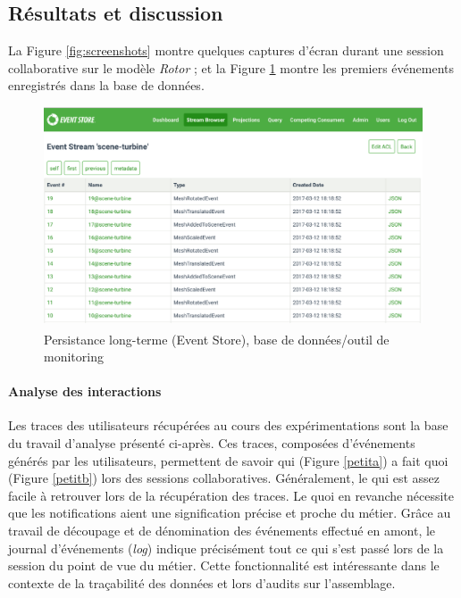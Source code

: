 \subsection{Résultats et discussion}
\label{sec:res}

La Figure \ref{fig:screenshots} montre quelques captures d'écran durant une 
session collaborative sur le modèle \textit{Rotor} ; et la Figure \ref{fig:ui4} montre 
les premiers événements enregistrés dans la base de données. 


\begin{figure}[h!]
	\centering
	\includegraphics[width=\textwidth]{eps/eventstore.eps}
	\caption{Persistance long-terme (Event Store\textsuperscript{\textregistered}), 
		base de données/outil de monitoring}
	\label{fig:ui4}
\end{figure}


\paragraph{Analyse des interactions}
Les traces des utilisateurs récupérées au cours des expérimentations sont la base 
du travail d'analyse présenté ci-après. Ces traces, composées d'événements 
générés par les utilisateurs, permettent de savoir qui (Figure \ref{petita}) a fait quoi 
(Figure \ref{petitb}) lors des sessions collaboratives. Généralement, le \og qui\fg{} 
est assez facile à retrouver lors de la récupération des traces. Le \og quoi\fg{} 
en revanche nécessite que les notifications aient une signification précise et proche 
du métier. Grâce au travail de découpage et de dénomination des événements 
effectué en amont, le journal d'événements (\textit{log}) indique précisément tout 
ce qui s'est passé lors de la session du point de vue du métier. Cette 
fonctionnalité est intéressante dans le contexte de la traçabilité des données et 
lors d'audits sur l'assemblage. 

